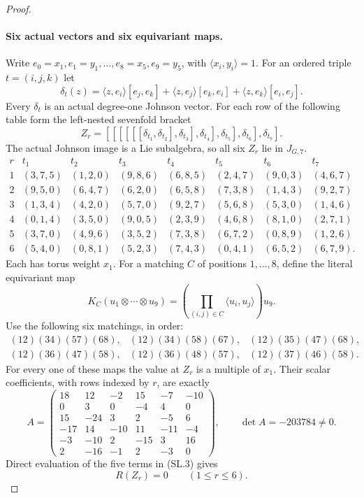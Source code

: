 \begin{proof}
\paragraph{Six actual vectors and six equivariant maps.}
Write $e_0=x_1,e_1=y_1,\ldots,e_8=x_5,e_9=y_5$, with
$\langle x_i,y_i\rangle=1$. For an ordered triple
$t=(i,j,k)$ let
\[
 \delta_t(z)=\langle z,e_i\rangle[e_j,e_k]
            +\langle z,e_j\rangle[e_k,e_i]
            +\langle z,e_k\rangle[e_i,e_j].
\]
Every $\delta_t$ is an actual degree-one Johnson vector.
For each row of the following table form the left-nested
sevenfold bracket
\[
 Z_r=[[[[[[\delta_{t_1},\delta_{t_2}],\delta_{t_3}],
               \delta_{t_4}],\delta_{t_5}],\delta_{t_6}],
               \delta_{t_7}].
\]
The actual Johnson image is a Lie subalgebra, so all six
$Z_r$ lie in $J_{G,7}$.
\[
\begin{array}{c|ccccccc}
r&t_1&t_2&t_3&t_4&t_5&t_6&t_7\\\hline
1&(3,7,5)&(1,2,0)&(9,8,6)&(6,8,5)&(2,4,7)&(9,0,3)&(4,6,7)\\
2&(9,5,0)&(6,4,7)&(6,2,0)&(6,5,8)&(7,3,8)&(1,4,3)&(9,2,7)\\
3&(1,3,4)&(4,2,0)&(5,7,0)&(9,2,7)&(5,6,8)&(5,3,0)&(1,4,6)\\
4&(0,1,4)&(3,5,0)&(9,0,5)&(2,3,9)&(4,6,8)&(8,1,0)&(2,7,1)\\
5&(3,7,0)&(4,9,6)&(3,5,2)&(7,3,8)&(6,7,2)&(0,8,9)&(1,2,6)\\
6&(5,4,0)&(0,8,1)&(5,2,3)&(7,4,3)&(0,4,1)&(6,5,2)&(6,7,9).
\end{array}                                                \tag{RV.2}
\]
Each has torus weight $x_1$. For a matching $C$ of
positions $1,\ldots,8$, define the literal equivariant map
\[
 K_C(u_1\otimes\cdots\otimes u_9)
      =\left(\prod_{(i,j)\in C}\langle u_i,u_j\rangle\right)u_9.
                                                               \tag{RV.3}
\]
Use the following six matchings, in order:
\[
\begin{array}{lll}
(12)(34)(57)(68),&(12)(34)(58)(67),&(12)(35)(47)(68),\\
(12)(36)(47)(58),&(12)(36)(48)(57),&(12)(37)(46)(58).
\end{array}
\]
For every one of these maps the value at $Z_r$ is a
multiple of $x_1$. Their scalar coefficients, with
rows indexed by $r$, are exactly
\[
 A=\begin{pmatrix}
18&12&-2&15&-7&-10\\
0&3&0&-4&4&0\\
15&-24&3&2&-5&6\\
-17&14&-10&11&-11&-4\\
-3&-10&2&-15&3&16\\
2&-16&-1&2&-3&0
\end{pmatrix},\qquad \det A=-203784\ne0.                 \tag{RV.4}
\]
Direct evaluation of the five terms in (SL.3) gives
\[
                         R(Z_r)=0\qquad(1\leq r\leq6).
                                                               \tag{RV.5}
\]


\end{proof}
